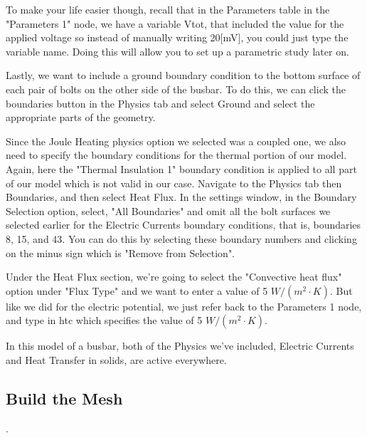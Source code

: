 To make your life easier though, recall that in the Parameters table in the "Parameters 1" node, we have a variable Vtot, that included the value for the applied voltage so instead of manually writing 20[mV], you could just type the variable name. Doing this will allow you to set up a parametric study later on.

Lastly, we want to include a ground boundary condition to the bottom surface of each pair of bolts on the other side of the busbar. To do this, we can click the boundaries button in the Physics tab and select Ground and select the appropriate parts of the geometry.


Since the Joule Heating physics option we selected was a coupled one, we also need to specify the boundary conditions for the thermal portion of our model. Again, here the "Thermal Insulation 1" boundary condition is applied to all part of our model which is not valid in our case. Navigate to the Physics tab then Boundaries, and then select Heat Flux. In the settings window, in the Boundary Selection option, select, "All Boundaries" and omit all the bolt surfaces we selected earlier for the Electric Currents boundary conditions, that is, boundaries 8, 15, and 43. You can do this by selecting these boundary numbers and clicking on the minus sign which is "Remove from Selection".

Under the Heat Flux section, we're going to select the "Convective heat flux" option under "Flux Type" and we want to enter a value of 5 $W/(m^2\cdot K)$. But like we did for the electric potential, we just refer back to the Parameters 1 node, and type in htc which specifies the value of 5 $W/(m^2\cdot K)$.


In this model of a busbar, both of the Physics we've included, Electric Currents and Heat Transfer in solids, are active everywhere.

\subsection{Build the Mesh}.